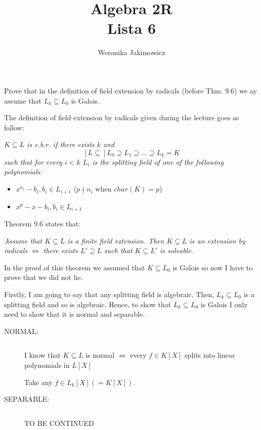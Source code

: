 \documentclass{article}
\title{Algebra 2R\\{\normalsize Lista 6}}
\author{Weronika Jakimowicz}
\date{}
\begin{document}
\begin{problem}[]{}
  Prove that in the definition of field extension by radicals  (before Thm. 9.6) we ay assume that $L_k\subseteq L_0$ is Galois.
\end{problem}

The definition of field extension by radicals given during the lecture goes as follow:

{\slshape
$K\subseteq L$ is e.b.r. if there exists $k$ and 
$$[L\subseteq]L_0\supseteq L_1\supseteq...\supseteq L_k= K$$
such that for every $i<k$ $L_i$ is the splitting field of one of the following polynomials:
\begin{itemize}
  \item $x^{n_i}-b_i,b_i\in L_{i+1}$ ($p\nmid n_i$ when $char(K)=p$)
  \item $x^p-x-b_i,b_i\in L_{i+1}$
\end{itemize}
}

Theorem 9.6 states that:

{\slshape
  Assume that $K\subseteq L$ is a finite field extension. Then $K\subseteq L$ is an extension by radicals $\iff$ there exists $L'\supseteq L$ such that $K\subseteq L'$ is solvable.
}

In the proof of this theorem we assumed that $K\subseteq L_0$ is Galois so now I have to prove that we did not lie.

Firstly, I am going to say that any splitting field is algebraic. Then, $L_k\subseteq L_0$ is a splitting field and so is algebraic. Hence, to show that $L_k\subseteq L_0$ is Galois I only need to show that it is normal and separable.

\begin{description}
  \item[NORMAL:]$ $

    I know that $K\subseteq L$ is normal $\iff$ every $f\in K[X]$ splits into linear polynomials in $L[X]$

    Take any $f\in L_k[X](=K[X])$. 

  \item[SEPARABLE:]$ $

    TO BE CONTINUED
\end{description}
\end{document}
